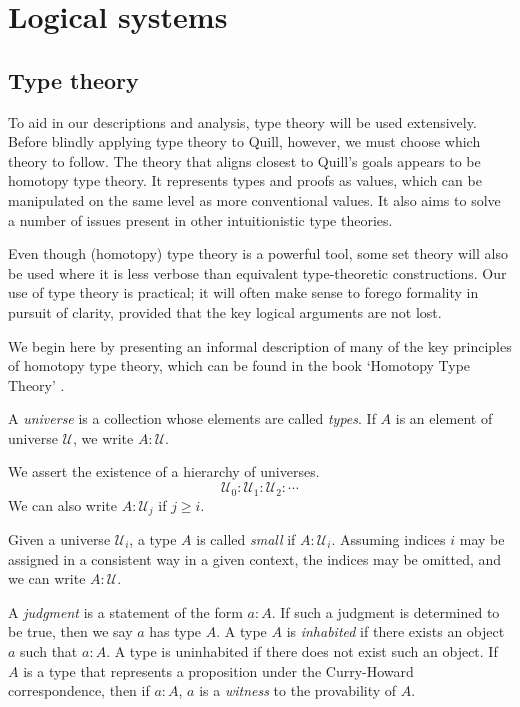\documentclass[UKenglish, 11pt, a4paper, parskip=half]{scrbook}
\begin{document}
\iffalse{}
\section{Logical systems}

\subsection{Type theory}

To aid in our descriptions and analysis, type theory will be used extensively.
Before blindly applying type theory to Quill, however, we must choose which theory to follow.
The theory that aligns closest to Quill's goals appears to be homotopy type theory.
It represents types and proofs as values, which can be manipulated on the same level as more conventional values.
It also aims to solve a number of issues present in other intuitionistic type theories.

Even though (homotopy) type theory is a powerful tool, some set theory will also be used where it is less verbose than equivalent type-theoretic constructions.
Our use of type theory is practical; it will often make sense to forego formality in pursuit of clarity, provided that the key logical arguments are not lost.

We begin here by presenting an informal description of many of the key principles of homotopy type theory, which can be found in the book `Homotopy Type Theory' \cite{hottbook}.

\begin{defn}
    A \textit{universe} is a collection whose elements are called \textit{types}.
    If \( A \) is an element of universe \( \mathcal U \), we write \( A : \mathcal U \).
\end{defn}
We assert the existence of a hierarchy of universes.
\[ \mathcal U_0 : \mathcal U_1 : \mathcal U_2 : \cdots \]
We can also write \( A : \mathcal U_j \) if \( j \geq i \).
\begin{defn}
    Given a universe \( \mathcal U_i \), a type \( A \) is called \textit{small} if \( A : \mathcal U_i \).
    Assuming indices \( i \) may be assigned in a consistent way in a given context, the indices may be omitted, and we can write \( A : \mathcal U \).
\end{defn}
\begin{defn}
    A \textit{judgment} is a statement of the form \( a : A \).
    If such a judgment is determined to be true, then we say \( a \) has type \( A \).
    A type \( A \) is \textit{inhabited} if there exists an object \( a \) such that \( a : A \).
    A type is uninhabited if there does not exist such an object.
    If \( A \) is a type that represents a proposition under the Curry-Howard correspondence, then if \( a : A \), \( a \) is a \textit{witness} to the provability of \( A \).
\end{defn}
\end{document}
